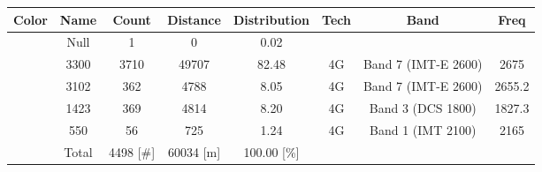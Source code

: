 \begin{longtable*}{|c|c|c|c|c|c|c|c|}\hline
{}
Color&Name&Count&Distance&Distribution&Tech&Band&Freq\\\hline\hline
{} &Null&1&0&0.02&&&\\\hline
{} &3300&3710&49707&82.48&4G&Band 7 (IMT-E 2600)&2675\\\hline
{} &3102&362&4788&8.05&4G&Band 7 (IMT-E 2600)&2655.2\\\hline
{} &1423&369&4814&8.20&4G&Band 3 (DCS 1800)&1827.3\\\hline
{} &550&56&725&1.24&4G&Band 1 (IMT 2100)&2165\\\hline
{} &Total&4498 [\#]&60034 [m]&100.00 [\%]&&&\\\hline
\end{longtable*}
